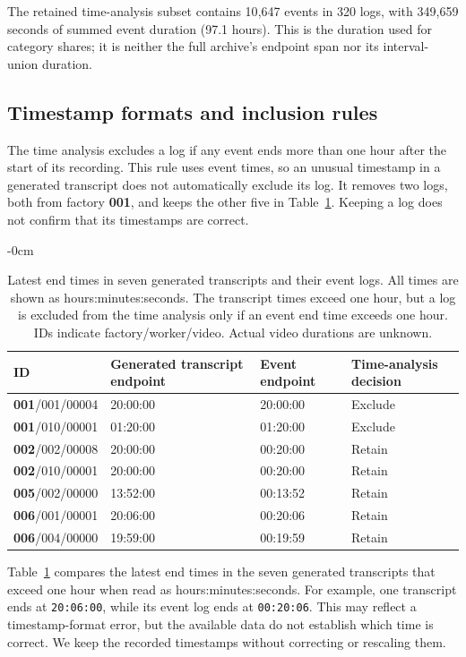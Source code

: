The retained time-analysis subset contains 10{,}647 events in 320 logs, with 349{,}659 seconds of summed event duration (97.1 hours). This is the duration used for category shares; it is neither the full archive's endpoint span nor its interval-union duration.

\subsection{Timestamp formats and inclusion rules}
\label{sec:temporal}
The time analysis excludes a log if any event ends more than one hour after the start of its recording. This rule uses event times, so an unusual timestamp in a generated transcript does not automatically exclude its log. It removes two logs, both from factory \textbf{001}, and keeps the other five in Table~\ref{tab:anomalies}. Keeping a log does not confirm that its timestamps are correct.

\begin{table}[!b]\begin{adjustwidth}{-\extralength}{0cm}
\caption{Latest end times in seven generated transcripts and their event logs. All times are shown as hours:minutes:seconds. The transcript times exceed one hour, but a log is excluded from the time analysis only if an event end time exceeds one hour. IDs indicate factory/worker/video. Actual video durations are unknown.}
\label{tab:anomalies}\small
\begin{tabular}{@{}llll@{}}\toprule
ID & Generated transcript endpoint & Event endpoint & Time-analysis decision \\\midrule
\textbf{001}/001/00004 & 20:00:00 & 20:00:00 & Exclude \\
\textbf{001}/010/00001 & 01:20:00 & 01:20:00 & Exclude \\
\textbf{002}/002/00008 & 20:00:00 & 00:20:00 & Retain \\
\textbf{002}/010/00001 & 20:00:00 & 00:20:00 & Retain \\
\textbf{005}/002/00000 & 13:52:00 & 00:13:52 & Retain \\
\textbf{006}/001/00001 & 20:06:00 & 00:20:06 & Retain \\
\textbf{006}/004/00000 & 19:59:00 & 00:19:59 & Retain \\
\bottomrule\end{tabular}
\end{adjustwidth}\end{table}

Table~\ref{tab:anomalies} compares the latest end times in the seven generated transcripts that exceed one hour when read as hours:minutes:seconds. For example, one transcript ends at \texttt{20:06:00}, while its event log ends at \texttt{00:20:06}. This may reflect a timestamp-format error, but the available data do not establish which time is correct. We keep the recorded timestamps without correcting or rescaling them.

